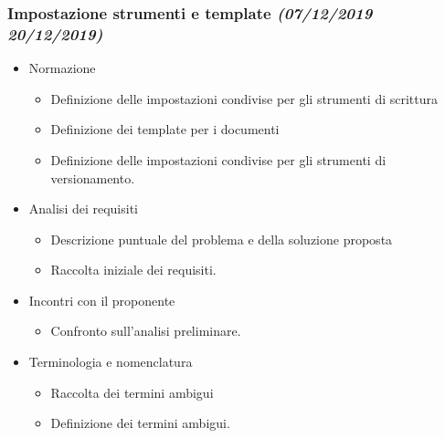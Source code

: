 \documentclass[../piano-di-progetto.tex]{subfiles}
\begin{document}
\subsubsection[Impostazione strumenti e template]{Impostazione strumenti e template {\normalsize\normalfont\itshape(07/12/2019  20/12/2019)}}%
\label{subs:impostazione_strumenti_e_template}
\begin{itemize}
  \item Normazione
  \begin{itemize}
    \item Definizione delle impostazioni condivise per gli strumenti di scrittura
    \item Definizione dei template per i documenti
    \item Definizione delle impostazioni condivise per gli strumenti di versionamento.
  \end{itemize}
  \item Analisi dei requisiti
  \begin{itemize}
    \item Descrizione puntuale del problema e della soluzione proposta
    \item Raccolta iniziale dei requisiti.
  \end{itemize}
  \item Incontri con il proponente
  \begin{itemize}
    \item Confronto sull'analisi preliminare.
  \end{itemize}
  \item Terminologia e nomenclatura
  \begin{itemize}
    \item Raccolta dei termini ambigui
    \item Definizione dei termini ambigui.
  \end{itemize}
\end{itemize}
\end{document}
